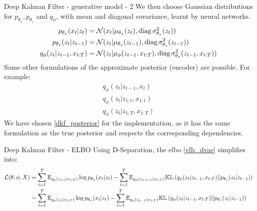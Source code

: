 \begin{frame}{Deep Kalman Filter - generative model - 2}
We then choose Gaussian distributions for $p_{\theta_x}, p_{\theta_z}$ and $q_\phi$, with mean and diagonal covariance, learnt by neural networks.
\begin{align}
    p_{\theta_x}(x_t \vert z_t) &= \mathcal{N}( x_t \vert \mu_{\theta_x}(z_t), \text{diag}\, \sigma_{\theta_x}^2(z_t))\\
    p_{\theta_z}(z_t \vert z_{t-1}) &= \mathcal{N}( z_t \vert \mu_{\theta_z}(z_{t-1}), \text{diag}\, \sigma_{\theta_z}^2(z_{t-1}))\\
    q_{\phi}(z_t \vert z_{t-1}, x_{t:T}) &= \mathcal{N}( z_t \vert \mu_{\phi}(z_{t-1}, x_{t:T}), \text{diag}\, \sigma_{\theta_z}^2(z_{t-1},x_{t:T}))
\end{align}
Some other formulations of the approximate posterior (encoder) are possible. For example:
\begin{align*}
    q_{\phi}(z_t \vert z_{t-1}, x_t) \\
    q_{\phi}(z_t \vert z_{1:t}, x_{1:t}) \\
    q_{\phi}(z_t \vert z_{1:T}, x_{1:T})
\end{align*}
We have chosen \ref{dkf_posterior} for the implementation, as it has the same formulation as the true posterior and respects the corresponding dependencies.
\end{frame}

\begin{frame}{Deep Kalman Filter - ELBO}
Using D-Separation, the \gls{elbo} \ref{vlb_dvae} simplifies into:
\begin{align}
    \mathcal{L}(\theta, \phi, X) &= \sum_{t=1}^T \mathbb{E}_{q_\phi(z_{1:t} \vert x_{1:T})} \log{p_{\theta_x}(x_t \vert z_t)} - \sum_{t=1}^T \mathbb{E}_{q_\phi(z_{1:t-1} \vert x_{1:T})} \mathbb{KL}\left( q_{\phi}(z_t \vert z_{t-1}, x_{t:T}) \vert\vert p_{\theta_z}(z_t \vert z_{t-1}) \right) \\
    &= \sum_{t=1}^T \mathbb{E}_{q_\phi(z_{t} \vert x_{1:T})} \log{p_{\theta_x}(x_t \vert z_t)} - \sum_{t=1}^T \mathbb{E}_{q_\phi(z_{t-1} \vert x_{1:T})} \mathbb{KL}\left( q_{\phi}(z_t \vert z_{t-1}, x_{t:T}) \vert\vert p_{\theta_z}(z_t \vert z_{t-1}) \right)
\end{align}
\end{frame}

